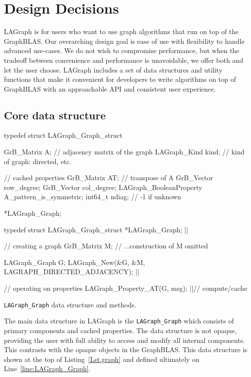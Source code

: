 \section{Design Decisions}
\label{sec:decisions}

LAGraph is for users who want to use graph algorithms that run on top of the GraphBLAS.  
Our overarching design goal is ease of use with flexibility to handle advanced use-cases.
We do not wish to compromise performance, but when the tradeoff between convenience and performance
is unavoidable, we offer both and let the user choose.
LAGraph includes a set of data structures and utility functions 
that make it convenient for developers to write algorithms on top of GraphBLAS with 
an approachable API and consistent user experience.

\subsection{Core data structure}

\begin{listing}
\begin{cplus}
typedef struct LAGraph_Graph_struct
{
    GrB_Matrix   A;      // adjacency matrix of the graph
    LAGraph_Kind kind;   // kind of graph: directed, etc.
    
    // cached properties
    GrB_Matrix   AT;     // transpose of A
    GrB_Vector   row_degree;
    GrB_Vector   col_degree;
    LAGraph_BooleanProperty A_pattern_is_symmetric;
    int64_t      ndiag;  // -1 if unknown
} *LAGraph_Graph;

typedef struct LAGraph_Graph_struct *LAGraph_Graph; |$\label{line:LAGraph_Graph}$|

// creating a graph
GrB_Matrix M;
// ...construction of M omitted

LAGraph_Graph G;
LAGraph_New(&G, &M, LAGRAPH_DIRECTED_ADJACENCY); |$\label{line:CreateGraphObject}$|

// operating on properties
LAGraph_Property_AT(G, msg);  |$\label{line:ComputeTranspose}$|// compute/cache
\end{cplus}
\caption{{\tt LAGraph\_Graph} data structure and methods.}
\label{Lst.graph}
\end{listing}

The main data structure in LAGraph is the \verb'LAGraph_Graph' which consists of primary components
and cached properties. The data structure is not opaque, providing the user with full ability to access and
modify all internal components. This contrasts with the opaque objects in the GraphBLAS.  This data structure is 
shown at the top of Listing~\ref{Lst.graph} and defined ultimately on Line~\ref{line:LAGraph_Graph}.

